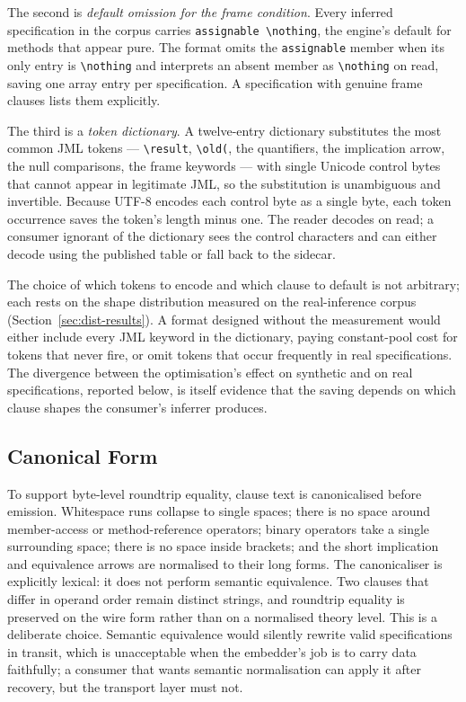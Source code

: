 The second is \emph{default omission for the frame condition}. Every inferred
specification in the corpus carries \texttt{assignable \textbackslash nothing},
the engine's default for methods that appear pure. The format omits the
\texttt{assignable} member when its only entry is \texttt{\textbackslash nothing}
and interprets an absent member as \texttt{\textbackslash nothing} on read,
saving one array entry per specification. A specification with genuine frame
clauses lists them explicitly.

The third is a \emph{token dictionary}. A twelve-entry dictionary substitutes
the most common JML tokens --- \texttt{\textbackslash result},
\texttt{\textbackslash old(}, the quantifiers, the implication arrow, the
null comparisons, the frame keywords --- with single Unicode control bytes that
cannot appear in legitimate JML, so the substitution is unambiguous and
invertible. Because UTF-8 encodes each control byte as a single byte, each token
occurrence saves the token's length minus one. The reader decodes on read; a
consumer ignorant of the dictionary sees the control characters and can either
decode using the published table or fall back to the sidecar.

The choice of which tokens to encode and which clause to default is not
arbitrary; each rests on the shape distribution measured on the real-inference
corpus (Section~\ref{sec:dist-results}). A format designed without the
measurement would either include every JML keyword in the dictionary, paying
constant-pool cost for tokens that never fire, or omit tokens that occur
frequently in real specifications. The divergence between the optimisation's
effect on synthetic and on real specifications, reported below, is itself
evidence that the saving depends on which clause shapes the consumer's inferrer
produces.

\subsection{Canonical Form}

To support byte-level roundtrip equality, clause text is canonicalised before
emission. Whitespace runs collapse to single spaces; there is no space around
member-access or method-reference operators; binary operators take a single
surrounding space; there is no space inside brackets; and the short implication
and equivalence arrows are normalised to their long forms. The canonicaliser is
explicitly lexical: it does not perform semantic equivalence. Two clauses that
differ in operand order remain distinct strings, and roundtrip equality is
preserved on the wire form rather than on a normalised theory level. This is a
deliberate choice. Semantic equivalence would silently rewrite valid
specifications in transit, which is unacceptable when the embedder's job is to
carry data faithfully; a consumer that wants semantic normalisation can apply it
after recovery, but the transport layer must not.

